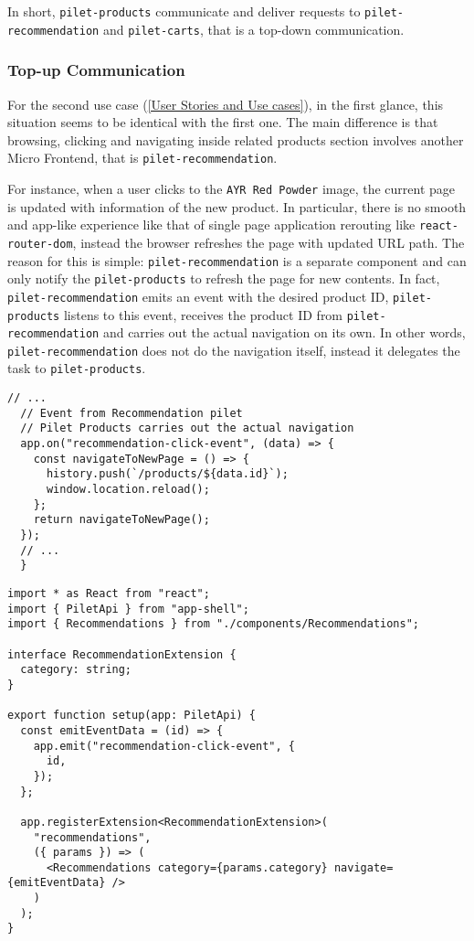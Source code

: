 \documentclass[a4paper]{book}
\begin{document}
In short, \verb|pilet-products| communicate and deliver requests to \verb|pilet-recommendation| and \verb|pilet-carts|, that is a top-down communication. 

\subsubsection{Top-up Communication} 
For the second use case (\ref{User Stories and Use cases}), in the first glance, this situation seems to be identical with the first one. The main difference is that browsing, clicking and navigating inside related products section involves another Micro Frontend, that is \verb|pilet-recommendation|. 

For instance, when a user clicks to the \verb|AYR Red Powder| image, the current page is updated with information of the new product. In particular, there is no smooth and app-like experience like that of single page application rerouting like \verb|react-router-dom|, instead the browser refreshes the page with updated URL path. The reason for this is simple: \verb|pilet-recommendation| is a separate component and can only notify the \verb|pilet-products| to refresh the page for new contents. In fact, \verb|pilet-recommendation| emits an event with the desired product ID, \verb|pilet-products| listens to this event, receives the product ID from \verb|pilet-recommendation| and carries out the actual navigation on its own. In other words, \verb|pilet-recommendation| does not do the navigation itself, instead it delegates the task to \verb|pilet-products|. 

\begin{lstlisting}[caption={pilet-products listens to custom event and carries out the navigation}]
  // ...
  // Event from Recommendation pilet
  // Pilet Products carries out the actual navigation
  app.on("recommendation-click-event", (data) => {
    const navigateToNewPage = () => {
      history.push(`/products/${data.id}`);
      window.location.reload();
    };
    return navigateToNewPage();
  });
  // ...
  }
\end{lstlisting}

\begin{lstlisting}[caption={pilet-recommendation emits custom event and transmits the product Id}]
import * as React from "react";
import { PiletApi } from "app-shell";
import { Recommendations } from "./components/Recommendations";

interface RecommendationExtension {
  category: string;
}

export function setup(app: PiletApi) {
  const emitEventData = (id) => {
    app.emit("recommendation-click-event", {
      id,
    });
  };

  app.registerExtension<RecommendationExtension>(
    "recommendations",
    ({ params }) => (
      <Recommendations category={params.category} navigate={emitEventData} />
    )
  );
}
\end{lstlisting}
\end{document}
